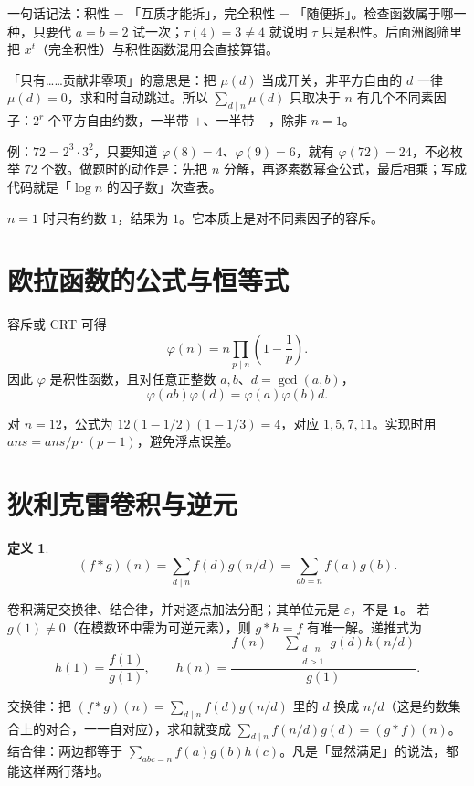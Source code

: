 \documentclass[UTF8,a4paper,11pt,twoside,openright,fontset=fandol]{ctexbook}
\theoremstyle{definition}
\newtheorem{definition}{定义}[chapter]
\newcommand{\eps}{\varepsilon}
\newcommand{\one}{\mathbf 1}
\begin{document}
\begin{tip}[词义：积性 / 完全积性]
一句话记法：积性 = 「互质才能拆」，完全积性 = 「随便拆」。检查函数属于哪一种，只要代 $a=b=2$ 试一次；$\tau(4)=3\ne4$ 就说明 $\tau$ 只是积性。后面洲阁筛里把 $x^t$（完全积性）与积性函数混用会直接算错。
\end{tip}

\begin{tip}[词义：把 $\mu(d)$ 当开关]
「只有……贡献非零项」的意思是：把 $\mu(d)$ 当成开关，非平方自由的 $d$ 一律 $\mu(d)=0$，求和时自动跳过。所以 $\sum_{d\mid n}\mu(d)$ 只取决于 $n$ 有几个不同素因子：$2^r$ 个平方自由约数，一半带 $+$、一半带 $-$，除非 $n=1$。
\end{tip}

\begin{tip}
例：$72=2^3\cdot3^2$，只要知道 $\varphi(8)=4$、$\varphi(9)=6$，就有 $\varphi(72)=24$，不必枚举 $72$ 个数。做题时的动作是：先把 $n$ 分解，再逐素数幂查公式，最后相乘；写成代码就是「$\log n$ 的因子数」次查表。
\end{tip}

$n=1$ 时只有约数 $1$，结果为 $1$。它本质上是对不同素因子的容斥。


\section{欧拉函数的公式与恒等式}
容斥或 CRT 可得
\[
 \varphi(n)=n\prod_{p\mid n}\left(1-\frac1p\right).
\]
因此 $\varphi$ 是积性函数，且对任意正整数 $a,b$、$d=\gcd(a,b)$，
\[
 \varphi(ab)\varphi(d)=\varphi(a)\varphi(b)d.
\]

对 $n=12$，公式为 $12(1-1/2)(1-1/3)=4$，对应 $1,5,7,11$。实现时用 $ans=ans/p\cdot(p-1)$，避免浮点误差。


\section{狄利克雷卷积与逆元}
\begin{definition}
\[
 (f*g)(n)=\sum_{d\mid n}f(d)g(n/d)=\sum_{ab=n}f(a)g(b).
\]
\end{definition}
卷积满足交换律、结合律，并对逐点加法分配；其单位元是 $\eps$，不是 $\one$。
若 $g(1)\ne0$（在模数环中需为可逆元素），则 $g*h=f$ 有唯一解。递推式为
\[
 h(1)=\frac{f(1)}{g(1)},\qquad
 h(n)=\frac{f(n)-\sum_{\substack{d\mid n\\d>1}}g(d)h(n/d)}{g(1)}.
\]

\begin{tip}[自己验证一次只要两行]
交换律：把 $(f*g)(n)=\sum_{d\mid n}f(d)g(n/d)$ 里的 $d$ 换成 $n/d$（这是约数集合上的对合，一一自对应），求和就变成 $\sum_{d\mid n}f(n/d)g(d)=(g*f)(n)$。结合律：两边都等于 $\sum_{abc=n}f(a)g(b)h(c)$。凡是「显然满足」的说法，都能这样两行落地。
\end{tip}
\end{document}
